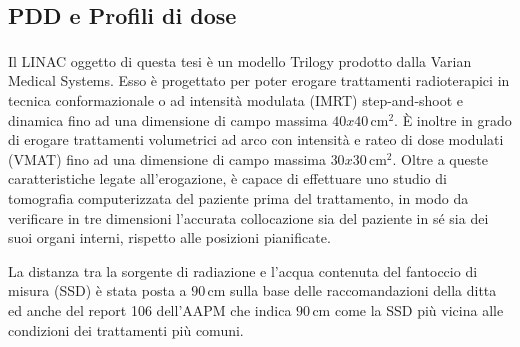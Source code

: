 \subsection{PDD e Profili di dose}
Il LINAC oggetto di questa tesi è un modello Trilogy\textsuperscript{\textcopyright} prodotto dalla Varian Medical Systems. Esso è progettato per poter erogare trattamenti radioterapici in tecnica conformazionale o ad intensità modulata (IMRT) step-and-shoot e dinamica fino ad una dimensione di campo massima $40x40\,$cm$^2$. \`E inoltre in grado di erogare trattamenti volumetrici ad arco con intensità e rateo di dose modulati (VMAT) fino ad una dimensione di campo massima $30x30\,$cm$^2$. Oltre a queste caratteristiche legate all'erogazione, è capace di effettuare uno studio di tomografia computerizzata del paziente prima del trattamento, in modo da verificare in tre dimensioni l'accurata collocazione sia del paziente in sé sia dei suoi organi interni, rispetto alle posizioni pianificate.

La distanza tra la sorgente di radiazione e l'acqua contenuta del fantoccio di misura (SSD) è stata posta a $90\,$cm sulla base delle raccomandazioni della ditta ed anche del report 106 dell'AAPM \cite{Das2008a} che indica $90\,$cm come la SSD più vicina alle condizioni dei trattamenti più comuni.


